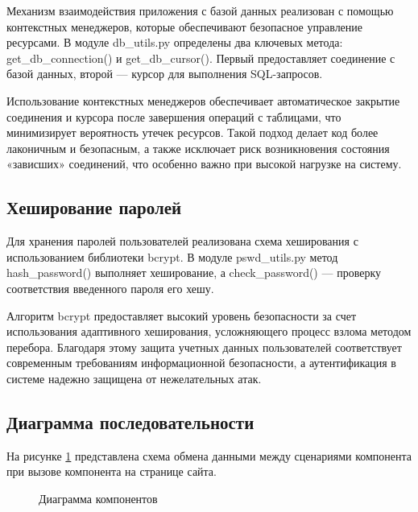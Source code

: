 Механизм взаимодействия приложения с базой данных реализован с помощью контекстных менеджеров, которые обеспечивают безопасное управление ресурсами. В модуле db\_utils.py определены два ключевых метода: get\_db\_connection() и get\_db\_cursor(). Первый предоставляет соединение с базой данных, второй — курсор для выполнения SQL-запросов.

Использование контекстных менеджеров обеспечивает автоматическое закрытие соединения и курсора после завершения операций с таблицами, что минимизирует вероятность утечек ресурсов. Такой подход делает код более лаконичным и безопасным, а также исключает риск возникновения состояния «зависших» соединений, что особенно важно при высокой нагрузке на систему.

\subsection{Хеширование паролей}

Для хранения паролей пользователей реализована схема хеширования с использованием библиотеки bcrypt. В модуле pswd\_utils.py метод hash\_password() выполняет хеширование, а check\_password() — проверку соответствия введенного пароля его хешу.

Алгоритм bcrypt предоставляет высокий уровень безопасности за счет использования адаптивного хеширования, усложняющего процесс взлома методом перебора. Благодаря этому защита учетных данных пользователей соответствует современным требованиям информационной безопасности, а аутентификация в системе надежно защищена от нежелательных атак.

\subsection{Диаграмма последовательности}

На рисунке \ref{data:image} представлена схема обмена данными между сценариями компонента при вызове компонента на странице сайта.

\begin{figure}[H]
	\caption{Диаграмма компонентов}
	\label{data:image}
\end{figure}

